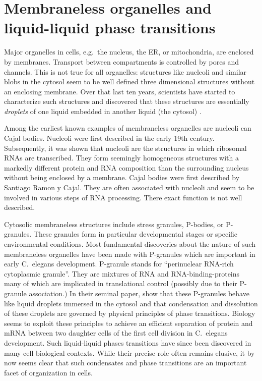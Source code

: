 \chapter{Membraneless organelles and liquid-liquid phase transitions}


Major organelles in cells, e.g.~the nucleus, the ER, or mitochondria, are enclosed by membranes.
Transport between compartments is controlled by pores and channels.
This is not true for all organelles: structures like nucleoli and similar blobs in the cytosol seem to be well defined three dimensional structures without an enclosing membrane.
Over that last ten years, scientists have started to characterize such structures and discovered that these structures are essentially \emph{droplets} of one liquid embedded in another liquid (the cytosol) \citet{brangwynne_germline_2009}.

Among the earliest known examples of membraneless organelles are nucleoli can Cajal bodies.
Nucleoli were first described in the early 19th century.
Subsequently, it was shown that nucleoli are the structures in which ribosomal RNAs are transcribed.
They form seemingly homogeneous structures with a markedly different protein and RNA composition than the surrounding nucleus without being enclosed by a membrane.
Cajal bodies were first described by Santiago Ramon y Cajal.
They are often associated with nucleoli and seem to be involved in various steps of RNA processing.
There exact function is not well described.

Cytosolic membraneless structures include stress granules, P-bodies, or P-granules.
These granules form in particular developmental stages or specific environmental conditions.
Most fundamental discoveries about the nature of such membraneless organelles have been made with P-granules which are important in early C.~elegans development.
P-granule stands for ``perinuclear RNA-rich cytoplasmic granule''.
They are mixtures of RNA and RNA-binding-proteins many of which are implicated in translational control (possibly due to their P-granule association.)
In their seminal paper, \citet{brangwynne_germline_2009} show that these P-granules behave like liquid droplets immersed in the cytosol and that condensation and dissolution of these droplets are governed by physical principles of phase transitions.
Biology seems to exploit these principles to achieve an efficient separation of protein and mRNA between two daughter cells of the first cell division in C.~elegans development.
Such liquid-liquid phases transitions have since been discovered in many cell biological contexts.
While their precise role often remains elusive, it by now seems clear that such condensates and phase transitions are an important facet of organization in cells.


